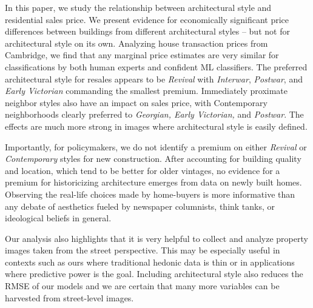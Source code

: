 \documentclass[]{article}
\begin{document}
In this paper, we study the relationship between architectural style and residential sales price. We present evidence for economically significant price differences between buildings from different architectural styles -- but not for architectural style on its own. Analyzing house transaction prices from Cambridge, we find that any marginal price estimates are very similar for classifications by both human experts and confident ML classifiers. The preferred architectural style for resales appears to be \emph{Revival} with \emph{Interwar}, \emph{Postwar}, and \emph{Early Victorian} commanding the smallest premium. Immediately proximate neighbor styles also have an impact on sales price, with Contemporary neighborhoods clearly preferred to \emph{Georgian, Early Victorian,} and \emph{Postwar}. The effects are much more strong in images where architectural style is easily defined. 

Importantly, for policymakers, we do not identify a premium on either \emph{Revival} or \emph{Contemporary} styles for new construction. After accounting for building quality and location, which tend to be better for older vintages, no evidence for a premium for historicizing architecture emerges from data on newly built homes. Observing the real-life choices made by home-buyers is more informative than any debate of aesthetics fueled by newspaper columnists, think tanks, or ideological beliefs in general.

Our analysis also highlights that it is very helpful to collect and analyze property images taken from the street perspective. This may be especially useful in contexts such as ours where traditional hedonic data is thin or in applications where predictive power is the goal. Including architectural style also reduces the RMSE of our models and we are certain that many more variables can be harvested from street-level images.




\end{document}
